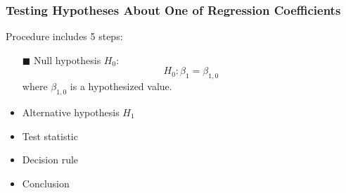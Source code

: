 \documentclass[11pt, xcolor=x11names,compress]{beamer}
\begin{document}
\begin{frame}[fragile,t]
\linespread{1.15}
\frametitle{Testing Hypotheses About One
of Regression Coefficients}

Procedure includes 5 steps:
\begin{itemize}
    \item [$\blacksquare$] Null hypothesis $H_0$:\\
    $$
    H_0: \beta_1 = \beta_{1,0}
    $$
    where $\beta_{1,0}$ is a hypothesized value.
    \item Alternative hypothesis $H_1$
    \item Test statistic
    \item Decision rule
    \item Conclusion
\end{itemize}

\end{frame}
\end{document}
